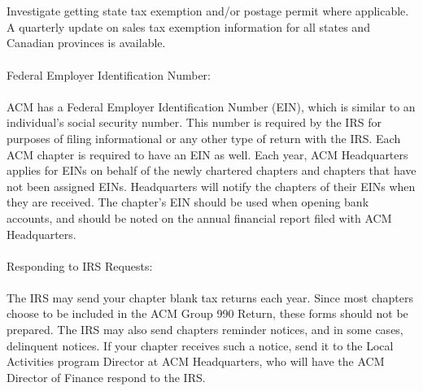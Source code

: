 \\
\\
Investigate getting state tax exemption and/or postage permit where applicable. A quarterly update on sales tax exemption information for all states and Canadian provinces is available.
\\
\\
Federal Employer Identification Number:
\\
\\
ACM has a Federal Employer Identification Number (EIN), which is similar to an individual's social security number. This number is required by the IRS for purposes of filing informational or any other type of return with the IRS. Each ACM chapter is required to have an EIN as well. Each year, ACM Headquarters applies for EINs on behalf of the newly chartered chapters and chapters that have not been assigned EINs. Headquarters will notify the chapters of their EINs when they are received. The chapter's EIN should be used when opening bank accounts, and should be noted on the annual financial report filed with ACM Headquarters.
\\
\\
Responding to IRS Requests:
\\
\\
The IRS may send your chapter blank tax returns each year. Since most chapters choose to be included in the ACM Group 990 Return, these forms should not be prepared. The IRS may also send chapters reminder notices, and in some cases, delinquent notices. If your chapter receives such a notice, send it to the Local Activities program Director at ACM Headquarters, who will have the ACM Director of Finance respond to the IRS.


